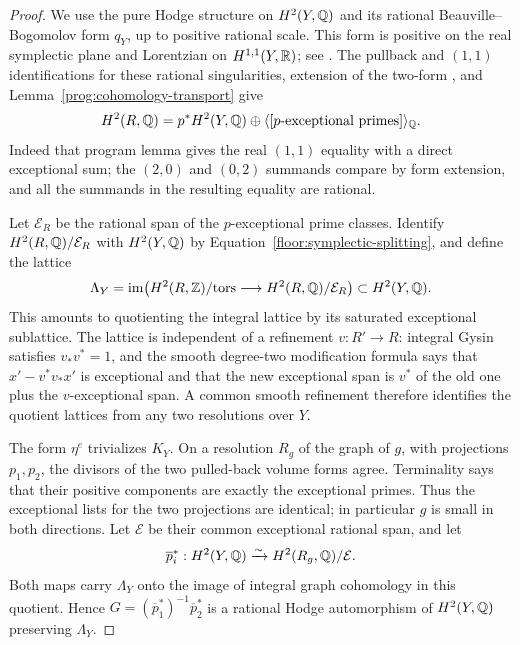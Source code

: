\begin{proof}
We use the pure Hodge structure on \(H^2(Y,\mathbb Q)\) and its rational
Beauville--Bogomolov form \(q_Y\), up to positive rational scale.  This
form is positive on the real symplectic plane and Lorentzian on
\(H^{1,1}(Y,\mathbb R)\); see \cite[Lemma~2.1, Definition~5.2, and
Lemmas~5.3 and~5.7]{BakkerLehn}.  The pullback and \((1,1)\)
identifications for these rational singularities, extension of the
two-form \cite[Corollary~1.8]{KebekusSchnell2021}, and
Lemma~\ref{prog:cohomology-transport} give
\begin{equation}\label{floor:symplectic-splitting}
 H^2(R,\mathbb Q)=p^*H^2(Y,\mathbb Q)\oplus
       \langle[p\text{-exceptional primes}]\rangle_{\mathbb Q}.
\end{equation}
Indeed that program lemma gives the real \((1,1)\) equality with a direct
exceptional sum; the \((2,0)\) and \((0,2)\) summands compare by form
extension, and all the summands in the resulting equality are rational.

Let \(\mathcal E_R\) be the rational span of the \(p\)-exceptional prime
classes.  Identify \(H^2(R,\mathbb Q)/\mathcal E_R\) with \(H^2(Y,\mathbb Q)\) by
Equation~\eqref{floor:symplectic-splitting}, and define the lattice
\[
 \Lambda_Y=
 \operatorname{im}\bigl(H^2(R,\mathbb Z)/\mathrm{tors}\longrightarrow
                 H^2(R,\mathbb Q)/\mathcal E_R\bigr)
 \subset H^2(Y,\mathbb Q).
\]
This amounts to quotienting the integral lattice by its saturated
exceptional sublattice.  The lattice is independent of a refinement
\(v:R'\to R\): integral Gysin satisfies \(v_*v^*=1\), and the smooth
degree-two modification formula says that
\(x'-v^*v_*x'\) is exceptional and that the new exceptional span is
\(v^*\) of the old one plus the \(v\)-exceptional span.  A common
smooth refinement therefore identifies the quotient lattices from any two
resolutions over \(Y\).

The form \(\eta^e\) trivializes \(K_Y\).  On a resolution \(R_g\) of
the graph of \(g\), with projections \(p_1,p_2\), the divisors of the
two pulled-back volume forms agree.  Terminality says that their positive
components are exactly the exceptional primes.  Thus the exceptional lists
for the two projections are identical; in particular \(g\) is small in
both directions.  Let \(\mathcal E\) be their common exceptional rational
span, and let
\[
 \overline p_i^*:H^2(Y,\mathbb Q)\xrightarrow{\sim}H^2(R_g,\mathbb Q)/\mathcal E.
\]
Both maps carry \(\Lambda_Y\) onto the image of integral
graph cohomology in this quotient.  Hence
\(G=(\overline p_1^*)^{-1}\overline p_2^*\) is a rational Hodge
automorphism of \(H^2(Y,\mathbb Q)\) preserving \(\Lambda_Y\).


\end{proof}

